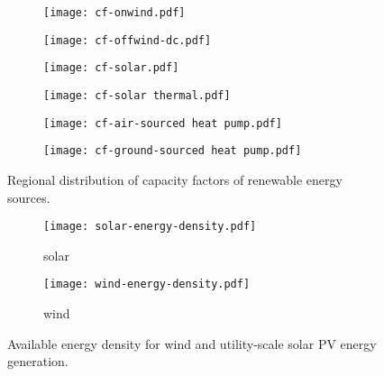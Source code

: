\begin{figure}
    \centering
    \begin{subfigure}[t]{0.49\textwidth}
        \centering
        \texttt{[image: cf-onwind.pdf]}
    \end{subfigure}
    \begin{subfigure}[t]{0.49\textwidth}
        \centering
        \texttt{[image: cf-offwind-dc.pdf]}
    \end{subfigure}
    \begin{subfigure}[t]{0.49\textwidth}
        \centering
        \texttt{[image: cf-solar.pdf]}
    \end{subfigure}
    \begin{subfigure}[t]{0.49\textwidth}
        \centering
        \texttt{[image: cf-solar thermal.pdf]}
    \end{subfigure}
    \begin{subfigure}[t]{0.49\textwidth}
        \centering
        \texttt{[image: cf-air-sourced heat pump.pdf]}
    \end{subfigure}
    \begin{subfigure}[t]{0.49\textwidth}
        \centering
        \texttt{[image: cf-ground-sourced heat pump.pdf]}
    \end{subfigure}
    \caption{Regional distribution of capacity factors of renewable energy sources.}
    \label{fig:cfs-maps}
\end{figure}


\begin{figure}
    \centering
    \begin{subfigure}[t]{0.49\textwidth}
        \centering
        \caption{solar}
        \texttt{[image: solar-energy-density.pdf]}
    \end{subfigure}
    \begin{subfigure}[t]{0.49\textwidth}
        \centering
        \caption{wind}
        \texttt{[image: wind-energy-density.pdf]}
    \end{subfigure}
    \caption{Available energy density for wind and utility-scale solar PV energy generation.}
    \label{fig:energy-density}
\end{figure}

